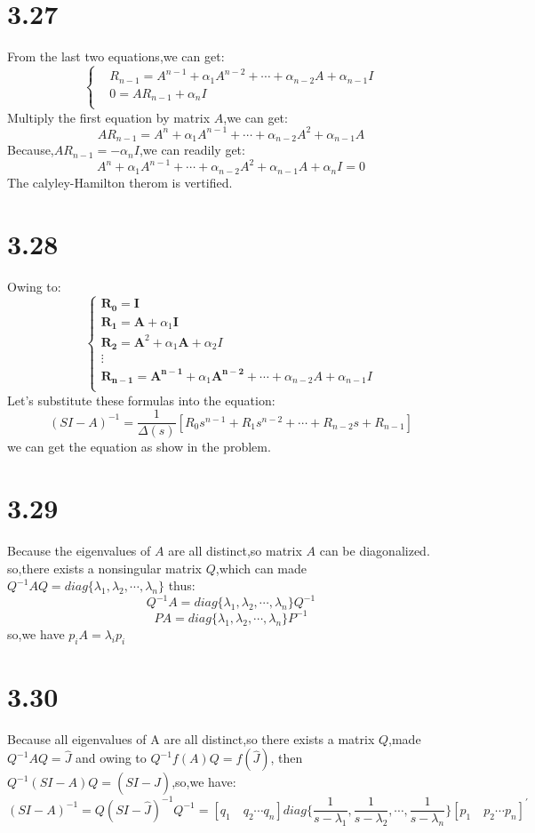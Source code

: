 \documentclass{article}
\begin{document}
\section*{3.27}
From the last two equations,we can get:
\[
\left\{    
\begin{array}{ll}
&R_{n-1}=A^{n-1}+\alpha_1A^{n-2}+\cdots+\alpha_{n-2}A+\alpha_{n-1}I\\
&0=AR_{n-1}+\alpha_{n}I\\
\end{array}
\right.
\]
Multiply the first equation by matrix $A$,we can get:
\[AR_{n-1}=A^{n}+\alpha_1A^{n-1}+\cdots+\alpha_{n-2}A^2+\alpha_{n-1}A\]
Because,$AR_{n-1}=-\alpha_nI$,we can readily get:
\[A^{n}+\alpha_1A^{n-1}+\cdots+\alpha_{n-2}A^2+\alpha_{n-1}A+\alpha_nI=0\]
The calyley-Hamilton therom is vertified.\\

\section*{3.28}
Owing to:
\[
\left\{
\begin{array}{ll}
\boldsymbol{R_0}=\boldsymbol{I}\\
\boldsymbol{R_1}=\boldsymbol{A}+\alpha_1\boldsymbol{I}\\
\boldsymbol{R_2}=\boldsymbol{A}^2+\alpha_1\boldsymbol{A}+\alpha_2I\\
\boldsymbol{\vdots}\\
\boldsymbol{R_{n-1}}=\boldsymbol{A^{n-1}}+\alpha_{1}\boldsymbol{A^{n-2}}+\cdots+\alpha_{n-2}A+\alpha_{n-1}I\\
\end{array}\right.
\]
Let's substitute these formulas into the equation:\\
\[(SI-A)^{-1}=\frac{1}{\Delta(s)}[R_0s^{n-1}+R_1s^{n-2}+\cdots+R_{n-2}s+R_{n-1}]\]
we can get the equation as show in the problem.\\

\section*{3.29}
Because the eigenvalues of $A$ are all distinct,so matrix $A$ can be diagonalized.
so,there exists a nonsingular matrix $Q$,which can made $Q^{-1}AQ=diag\{\lambda_1,\lambda_2,\cdots,\lambda_n\}$
thus:
\[Q^{-1}A=diag\{\lambda_1,\lambda_2,\cdots,\lambda_n\}Q^{-1}\]
\[PA=diag\{\lambda_1,\lambda_2,\cdots,\lambda_n\}P^{-1}\]
so,we have $p_iA=\lambda_ip_i$


\section*{3.30}
Because all eigenvalues of A are all distinct,so there exists a matrix $Q$,made $Q^{-1}AQ=\hat{J}$ and owing to $Q^{-1}f(A)Q=f(\hat{J})$,
then $Q^{-1}(SI-A)Q=(SI-\hat{J})$,so,we have:
\[(SI-A)^{-1}=Q(SI-\hat{J})^{-1}Q^{-1}=[q_1 \quad q_2 \cdots q_n]diag\{\frac{1}{s-\lambda_1},\frac{1}{s-\lambda_2},\cdots,\frac{1}{s-\lambda_n}\}[p_1 \quad p_2 \cdots p_n]^{'}\]
\end{document}
